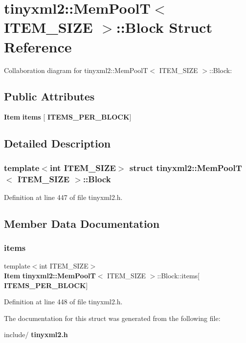\section{tinyxml2\+:\+:Mem\+PoolT$<$ I\+T\+E\+M\+\_\+\+S\+I\+ZE $>$\+:\+:Block Struct Reference}
\label{structtinyxml2_1_1_mem_pool_t_1_1_block}


Collaboration diagram for tinyxml2\+:\+:Mem\+PoolT$<$ I\+T\+E\+M\+\_\+\+S\+I\+ZE $>$\+:\+:Block\+:
\subsection*{Public Attributes}
\begin{DoxyCompactItemize}
\item 
\textbf{ Item} \textbf{ items} [\textbf{ I\+T\+E\+M\+S\+\_\+\+P\+E\+R\+\_\+\+B\+L\+O\+CK}]
\end{DoxyCompactItemize}


\subsection{Detailed Description}
\subsubsection*{template$<$int I\+T\+E\+M\+\_\+\+S\+I\+ZE$>$\newline
struct tinyxml2\+::\+Mem\+Pool\+T$<$ I\+T\+E\+M\+\_\+\+S\+I\+Z\+E $>$\+::\+Block}



Definition at line 447 of file tinyxml2.\+h.



\subsection{Member Data Documentation}
\mbox{\label{structtinyxml2_1_1_mem_pool_t_1_1_block_a4f2589e877b60f26313e107433e550f7}} 
\subsubsection{items}
{\footnotesize\ttfamily template$<$int I\+T\+E\+M\+\_\+\+S\+I\+ZE$>$ \\
\textbf{ Item} \textbf{ tinyxml2\+::\+Mem\+PoolT}$<$ I\+T\+E\+M\+\_\+\+S\+I\+ZE $>$\+::Block\+::items[\textbf{ I\+T\+E\+M\+S\+\_\+\+P\+E\+R\+\_\+\+B\+L\+O\+CK}]}



Definition at line 448 of file tinyxml2.\+h.



The documentation for this struct was generated from the following file\+:\begin{DoxyCompactItemize}
\item 
include/\textbf{ tinyxml2.\+h}\end{DoxyCompactItemize}
